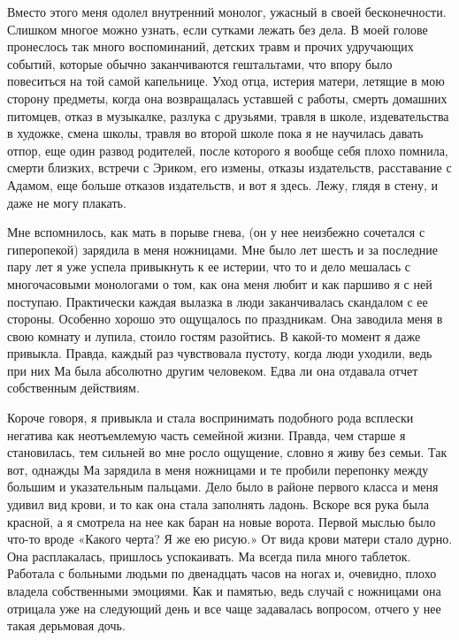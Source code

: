 \documentclass[
]{book}
\begin{document}
Вместо этого меня одолел внутренний монолог, ужасный в своей бесконечности. Слишком многое можно узнать, если сутками лежать без дела. В моей голове пронеслось так много воспоминаний, детских травм и прочих удручающих событий, которые обычно заканчиваются гештальтами, что впору было повеситься на той самой капельнице. Уход отца, истерия матери, летящие в мою сторону предметы, когда она возвращалась уставшей с работы, смерть домашних питомцев, отказ в музыкалке, разлука с друзьями, травля в школе, издевательства в художке, смена школы, травля во второй школе пока я не научилась давать отпор, еще один развод родителей, после которого я вообще себя плохо помнила, смерти близких, встречи с Эриком, его измены, отказы издательств, расставание с Адамом, еще больше отказов издательств, и вот я здесь. Лежу, глядя в стену, и даже не могу плакать.

Мне вспомнилось, как мать в порыве гнева, (он у нее неизбежно сочетался с гиперопекой) зарядила в меня ножницами. Мне было лет шесть и за последние пару лет я уже успела привыкнуть к ее истерии, что то и дело мешалась с многочасовыми монологами о том, как она меня любит и как паршиво я с ней поступаю. Практически каждая вылазка в люди заканчивалась скандалом с ее стороны. Особенно хорошо это ощущалось по праздникам. Она заводила меня в свою комнату и лупила, стоило гостям разойтись. В какой-то момент я даже привыкла. Правда, каждый раз чувствовала пустоту, когда люди уходили, ведь при них Ма была абсолютно другим человеком. Едва ли она отдавала отчет собственным действиям.

Короче говоря, я привыкла и стала воспринимать подобного рода всплески негатива как неотъемлемую часть семейной жизни. Правда, чем старше я становилась, тем сильней во мне росло ощущение, словно я живу без семьи. Так вот, однажды Ма зарядила в меня ножницами и те пробили перепонку между большим и указательным пальцами. Дело было в районе первого класса и меня удивил вид крови, и то как она стала заполнять ладонь. Вскоре вся рука была красной, а я смотрела на нее как баран на новые ворота. Первой мыслью было что-то вроде «Какого черта? Я же ею рисую.» От вида крови матери стало дурно. Она расплакалась, пришлось успокаивать. Ма всегда пила много таблеток. Работала с больными людьми по двенадцать часов на ногах и, очевидно, плохо владела собственными эмоциями. Как и памятью, ведь случай с ножницами она отрицала уже на следующий день и все чаще задавалась вопросом, отчего у нее такая дерьмовая дочь.
\end{document}
